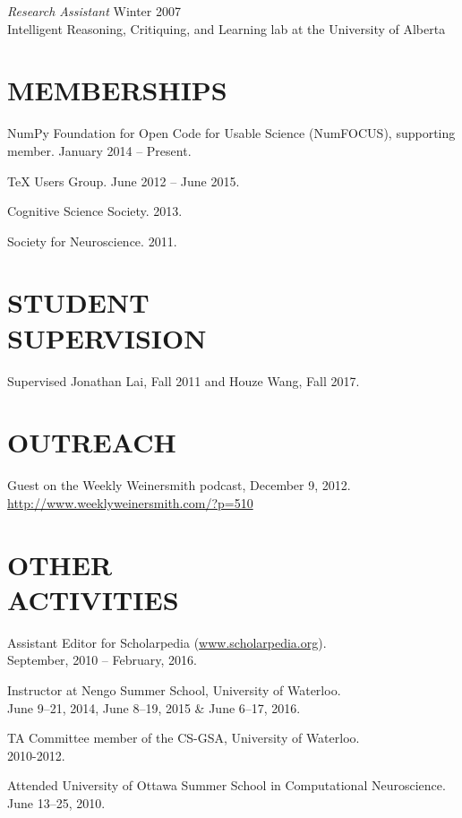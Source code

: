 \documentclass[line,margin]{res}
\begin{document}
\begin{resume}
{\sl Research Assistant} \hfill Winter 2007 \\
Intelligent Reasoning, Critiquing, and Learning lab at the University of Alberta

\section{MEMBERSHIPS}

NumPy Foundation for Open Code for Usable Science (NumFOCUS),
supporting member. January 2014 -- Present.

TeX Users Group. June 2012 -- June 2015.

Cognitive Science Society. 2013.

Society for Neuroscience. 2011.

\section{STUDENT \\ SUPERVISION}

Supervised Jonathan Lai, Fall 2011
and Houze Wang, Fall 2017.

\section{OUTREACH}

Guest on the Weekly Weinersmith podcast, December 9, 2012. \\
\url{http://www.weeklyweinersmith.com/?p=510}

\section{OTHER \\ ACTIVITIES}

Assistant Editor for Scholarpedia (\url{www.scholarpedia.org}). \\
September, 2010 -- February, 2016.

Instructor at Nengo Summer School, University of Waterloo. \\
June 9--21, 2014, June 8--19, 2015 \& June 6--17, 2016.

TA Committee member of the CS-GSA, University of Waterloo. \\
2010-2012.

Attended University of Ottawa Summer School in Computational Neuroscience. \\
June 13--25, 2010. \vspace{8pt}


\end{resume}
\end{document}
